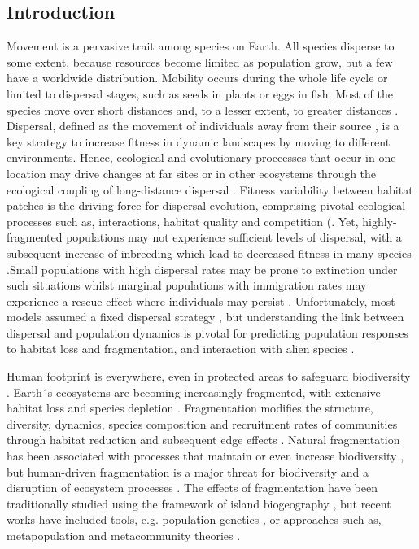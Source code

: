 \documentclass[12pt]{article}
\begin{document}
\begin{justify}
{{{{{\section{Introduction}
Movement is a pervasive trait among species on Earth. All species disperse to some extent, because resources become limited as population grow, but a few have a worldwide distribution. Mobility occurs during the whole life cycle or limited to dispersal stages, such as seeds in plants or eggs in fish. Most of the species move over short distances and, to a lesser extent, to greater distances \citep{davidson2004quantifying}. Dispersal, defined as the movement of individuals away from their source \citep{nathan2003methods}, is a key strategy to increase fitness in dynamic landscapes by moving to different environments. Hence, ecological and evolutionary proccesses that occur in one location may drive changes at far sites or in other ecosystems through the ecological coupling of long-distance dispersal \citep{gaines2007connecting}. Fitness variability between habitat patches is the driving force for dispersal evolution, comprising pivotal ecological processes such as, interactions, habitat quality and competition (\citep{bowler2005causes}. Yet, highly-fragmented populations may not experience sufficient levels of dispersal, with a subsequent increase of inbreeding which lead to decreased fitness in many species \citep{fath2018encyclopedia}.Small populations with high dispersal rates may be prone to extinction under such situations  whilst marginal populations with immigration rates may experience a rescue effect where individuals may persist \citep{eriksson2014emergence}. Unfortunately, most models assumed a fixed dispersal strategy \citep{mccallum2001should, levin2003ecology}, but understanding the link between dispersal and population dynamics is pivotal for predicting population responses to habitat loss and fragmentation, and interaction with alien species \citep{bowler2005causes}.

Human footprint is everywhere, even in protected areas to safeguard biodiversity \citep{ tournadre2014anthropogenic, jones2018one}. Earth´s ecosystems are becoming increasingly fragmented, with extensive habitat loss and species depletion \citep{haddad2015habitat}. Fragmentation modifies the structure, diversity, dynamics, species composition and recruitment rates of communities through habitat reduction and subsequent edge effects \citep{laurance1998effects, short2011extinction}. Natural fragmentation has been associated with processes that maintain or even increase biodiversity \citep{tilman1988plant}, but human-driven fragmentation is a major threat for biodiversity \citep{pimm2000biodiversity} and a disruption of ecosystem processes \citep{achard2002determination}. The effects of fragmentation have been traditionally studied using the framework of island biogeography \citep{whittaker2007island}, but recent works have included tools, e.g. population genetics \citep{young1996population}, or approaches such as, metapopulation \citep{hanski2004ecology} and metacommunity theories \citep{mouquet2011extinction}.

}}}}}
\end{justify}
\end{document}
